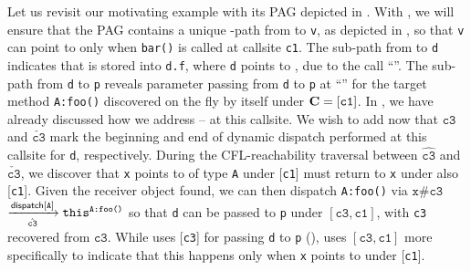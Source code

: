 Let us revisit our motivating example with its PAG depicted in
. With \LFCR, we will ensure that the PAG contains a unique
\LFCR-path from  to \texttt{v}, as depicted in 
, so that \texttt{v} can point to 
  only when \texttt{bar()} is called at callsite \texttt{c1}. 
The sub-path from  to
\texttt{d} indicates that  is stored into \texttt{d.f}, where
\texttt{d} points to , due to the call 
``''. The sub-path from \texttt{d} to \texttt{p}
reveals parameter passing from \texttt{d} to \texttt{p} at 
``'' for the target
method \texttt{A:foo()} discovered on the fly by \LFCR itself under $\textbf{C}=[\texttt{c1}]$. In 
,  we have already discussed how we
address  --  at this callsite. We wish to add
now that $\hat{\boxed{\texttt{c3}}}$ and $\check{\boxed{\texttt{c3}}}$ mark
the beginning and end of dynamic dispatch performed at this callsite for
\texttt{d}, respectively. During the CFL-reachability traversal
between $\hat{\boxed{\texttt{c3}}}$ and $\check{\boxed{\texttt{c3}}}$, we
discover that
\texttt{x} points to    of  type \texttt{A}
 under [\texttt{c1}] must return to \texttt{x} under also [\texttt{c1}].
Given the receiver object  found,
we can then
dispatch \texttt{A:foo()} via $\texttt{x\#c3}$  $\xrightarrow[\hat{\texttt{c3}}]{\textsf{dispatch}[\texttt{A}]}\texttt{this}^\texttt{A:foo()}$
so that \texttt{d} can be passed to \texttt{p} 
under $[\texttt{c3}, \texttt{c1}]$, with
  \texttt{c3}  recovered from ${\boxed{\texttt{c3}}}$. While \manuLFC \cite{sridharan2006refinement} uses
  [\texttt{c3}]  for 
 passing \texttt{d} to \texttt{p}  
  (), \LFCR uses
  $[\texttt{c3}, \texttt{c1}]$ more specifically
   to indicate that this happens only when \texttt{x} points to   under [\texttt{c1}].








